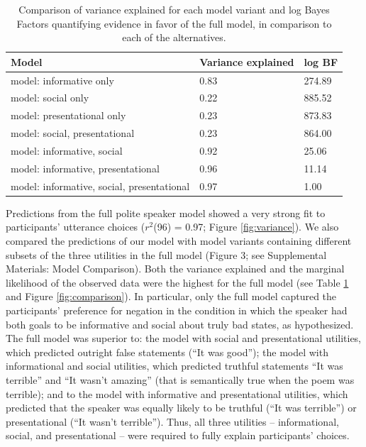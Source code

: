 \documentclass[12pt]{article}
\begin{document}
\begin{table}[tbp]
\begin{center}
\begin{threeparttable}
\caption{\label{tab:comparisonTable}Comparison of variance explained for each model variant and log Bayes Factors quantifying evidence in favor of the full model, in comparison to each of the alternatives.}
\begin{tabular}{lll}
\toprule
Model & \multicolumn{1}{c}{Variance 
explained} & \multicolumn{1}{c}{log BF}\\
\midrule
model: 
informative only & 0.83 & 274.89\\
model: 
social only & 0.22 & 885.52\\
model: 
presentational 
only & 0.23 & 873.83\\
model: 
social, 
presentational & 0.23 & 864.00\\
model: 
informative, 
social & 0.92 & 25.06\\
model: 
informative, 
presentational & 0.96 & 11.14\\
model: 
informative, 
social, 
presentational & 0.97 & 1.00\\
\bottomrule
\end{tabular}
\end{threeparttable}
\end{center}
\end{table}

Predictions from the full polite speaker model showed a very strong fit
to participants' utterance choices (\(r^2\)(96) = 0.97; Figure
\ref{fig:variance}). We also compared the predictions of our model with
model variants containing different subsets of the three utilities in
the full model (Figure 3; see Supplemental Materials: Model Comparison).
Both the variance explained and the marginal likelihood of the observed
data were the highest for the full model (see Table
\ref{tab:comparisonTable} and Figure \ref{fig:comparison}). In
particular, only the full model captured the participants' preference
for negation in the condition in which the speaker had both goals to be
informative and social about truly bad states, as hypothesized. The full
model was superior to: the model with social and presentational
utilities, which predicted outright false statements (\enquote{It was
good}); the model with informational and social utilities, which
predicted truthful statements \enquote{It was terrible} and \enquote{It
wasn't amazing} (that is semantically true when the poem was terrible);
and to the model with informative and presentational utilities, which
predicted that the speaker was equally likely to be truthful
(\enquote{It was terrible}) or presentational (\enquote{It wasn't
terrible}). Thus, all three
utilities -- informational, social, and presentational -- were required
to fully explain participants' choices.
\end{document}
